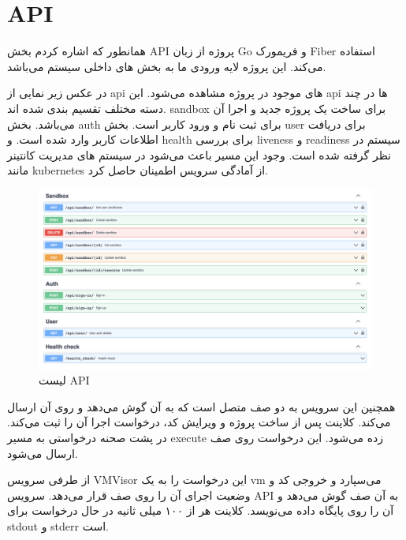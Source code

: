 
\section{API}

همانطور که اشاره کردم بخش API پروژه از زبان Go و فریمورک Fiber استفاده می‌کند.
این پروژه لایه ورودی ما به بخش های داخلی سیستم می‌باشد.

در عکس زیر نمایی از api های موجود در پروژه مشاهده می‌شود.
این api ها در چند دسته مختلف تقسیم بندی شده اند. sandbox برای ساخت یک پروژه جدید و اجرا آن می‌باشد.
بخش auth برای ثبت نام و ورود کاربر است.
بخش user برای دریافت اطلاعات کاربر وارد شده است.
و health برای بررسی liveness و readiness سیستم در نظر گرفته شده است.
وجود این مسیر باعث می‌شود در سیستم های مدیریت کانتینر مانند kubernetes از آمادگی سرویس اطمینان حاصل کرد.

\begin{figure}[htbp]
    \centering
    \includegraphics[width=1\textwidth]{./3-Design/swagger.png}
    \caption{لیست API}
    \label{fig:swagger}
\end{figure}

همچنین این سرویس به دو صف متصل است که به آن گوش می‌دهد و روی آن ارسال می‌کند.
کلاینت پس از ساخت پروژه و ویرایش کد، درخواست اجرا آن را ثبت  می‌کند. در پشت صحنه درخواستی به مسیر execute
زده می‌شود. این درخواست روی صف  ارسال می‌شود.

از طرفی سرویس VMVisor این درخواست را به یک vm می‌سپارد و خروجی کد و وضعیت اجرای آن را روی صف  قرار می‌دهد.
سرویس API به آن صف گوش می‌دهد و آن را روی پایگاه داده می‌نویسد.
کلاینت هر از ۱۰۰ میلی ثانیه در حال درخواست برای stdout و stderr است.
